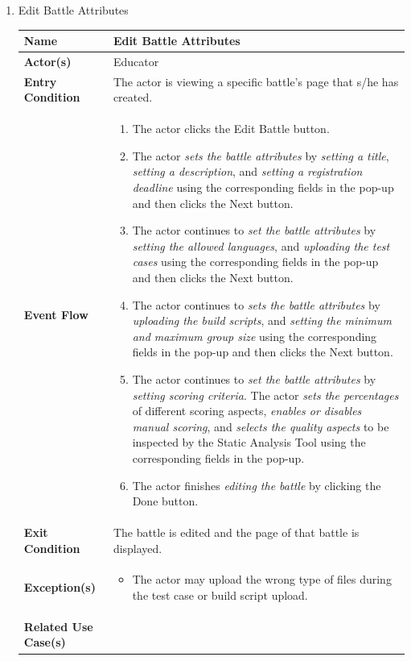 \begin{enumerate}
\item Edit Battle Attributes
\begin{center}
    \begin{tabular}{ | m{10em} | m{10cm}| } 
      \hline
      \textbf{Name} & Edit Battle Attributes \\ 
      \hline
      \textbf{Actor(s)} & Educator \\ 
      \hline
      \textbf{Entry Condition} & The actor is viewing a specific battle's page that s/he has created. \\ 
      \hline
      \textbf{Event Flow} & 
          \begin{enumerate}[(1)]
              \item The actor clicks the Edit Battle button.
              \item The actor \textit{sets the battle attributes} by \textit{setting a title}, \textit{setting a description}, and \textit{setting a registration deadline} using the corresponding fields in the pop-up and then clicks the Next button.
              \item The actor continues to \textit{set the battle attributes} by \textit{setting the allowed languages}, and \textit{uploading the test cases} using the corresponding fields in the pop-up and then clicks the Next button.
              \item The actor continues to \textit{sets the battle attributes} by \textit{uploading the build scripts}, and \textit{setting the minimum and maximum group size} using the corresponding fields in the pop-up and then clicks the Next button.
              \item The actor continues to \textit{set the battle attributes} by \textit{setting scoring criteria}. The actor \textit{sets the percentages} of different scoring aspects, \textit{enables or disables manual scoring}, and \textit{selects the quality aspects} to be inspected by the Static Analysis Tool using the corresponding fields in the pop-up.
              \item The actor finishes \textit{editing the battle} by clicking the Done button.
          \end{enumerate}
      \\ 
      \hline
      \textbf{Exit Condition} & The battle is edited and the page of that battle is displayed.  \\ 
      \hline
      \textbf{Exception(s)} & 
      \begin{itemize}
          \item The actor may upload the wrong type of files during the test case or build script upload.
      \end{itemize}
          \\ 
      \hline
      \textbf{Related Use Case(s)} &
    

\end{tabular}
\end{center}
\end{enumerate}
